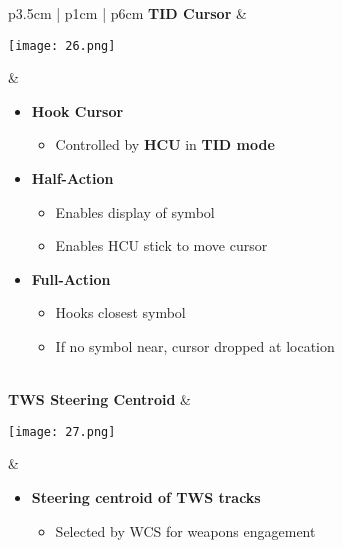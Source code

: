 \documentclass[8pt,usenames,dvipsnames,twoside]{article}
\begin{document}
\begin{center}
\begin{longtable}{p{3.5cm} | p{1cm} |  p{6cm}}
				\textbf{TID Cursor} &
				\begin{minipage}[t]{\linewidth}
					\vspace{-7pt}
					\centering
					\texttt{[image: 26.png]}
				\end{minipage} &  
				\begin{minipage}[t]{\linewidth}
					\vspace{-7pt}
					\begin{itemize}
						\item \textbf{Hook Cursor}
						\begin{itemize}
							\item Controlled by \textbf{HCU} in \textbf{TID mode}
						\end{itemize}
						\item \textbf{Half-Action}
						\begin{itemize}
							\item Enables display of symbol
							\item Enables HCU stick to move cursor
						\end{itemize}
						\item \textbf{Full-Action}
						\begin{itemize}
							\item Hooks closest symbol
							\item If no symbol near, cursor dropped at location
						\end{itemize}
					\end{itemize}
				\end{minipage} \\
				\midrule
				\textbf{TWS Steering Centroid} & 
				\begin{minipage}[t]{\linewidth}
					\vspace{-7pt}
					\centering
					\texttt{[image: 27.png]}
				\end{minipage} &  
				\begin{minipage}[t]{\linewidth}
					\vspace{-7pt}
					\begin{itemize}
						\item \textbf{Steering centroid of TWS tracks}
						\begin{itemize}
							\item Selected by WCS for weapons engagement
						\end{itemize}
					\end{itemize}
				\end{minipage} \\

\end{longtable}
\end{center}
\end{document}
